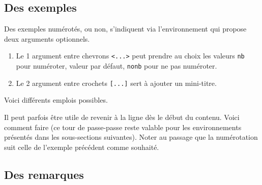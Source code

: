 \documentclass[10pt, a4paper]{article}
\begin{document}


\subsection{Des exemples}

Des exemples numérotés, ou non, s'indiquent via l'environnement  qui propose deux arguments optionnels.

\begin{enumerate}
    \item Le 1\ier{} argument entre chevrons \verb#<...># peut prendre au choix les valeurs \verb#nb# pour numéroter, valeur par défaut, \verb#nonb# pour ne pas numéroter.

    \item Le 2\ieme{} argument entre crochets \verb#[...]# sert à ajouter un mini-titre.
\end{enumerate}


Voici différents emplois possibles.









\begin{bdoctip}
    Il peut parfois être utile de revenir à la ligne dès le début du contenu. Voici comment faire (ce tour de passe-passe reste valable pour les environnements présentés dans les sous-sections suivantes). Noter au passage que la numérotation suit celle de l'exemple précédent comme souhaité.

\end{bdoctip}



\subsection{Des remarques}
\end{document}
